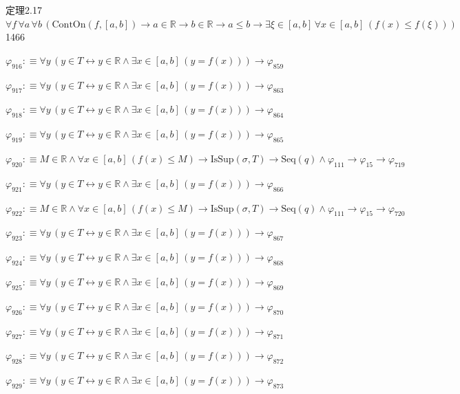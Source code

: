 \begin{fullproof}{定理2.17}{$\forall f\,\forall a\,\forall b\,(\mathrm{ContOn}(f,[a,b]) \to a \in \mathbb{R} \to b \in \mathbb{R} \to a \leq b \to \exists \xi \in [a,b]\,\forall x \in [a,b]\,(f(x) \leq f(\xi)))$}{1466}
\begin{abbrevlist}
\item $\varphi_{916} :\equiv \forall y\,(y \in T \leftrightarrow y \in \mathbb{R} \land \exists x \in [a,b]\,(y = f(x))) \to \varphi_{859}$
\item $\varphi_{917} :\equiv \forall y\,(y \in T \leftrightarrow y \in \mathbb{R} \land \exists x \in [a,b]\,(y = f(x))) \to \varphi_{863}$
\item $\varphi_{918} :\equiv \forall y\,(y \in T \leftrightarrow y \in \mathbb{R} \land \exists x \in [a,b]\,(y = f(x))) \to \varphi_{864}$
\item $\varphi_{919} :\equiv \forall y\,(y \in T \leftrightarrow y \in \mathbb{R} \land \exists x \in [a,b]\,(y = f(x))) \to \varphi_{865}$
\item $\varphi_{920} :\equiv M \in \mathbb{R} \land \forall x \in [a,b]\,(f(x) \leq M) \to \mathrm{IsSup}(\sigma,T) \to \mathrm{Seq}(q) \land \varphi_{111} \to \varphi_{15} \to \varphi_{719}$
\item $\varphi_{921} :\equiv \forall y\,(y \in T \leftrightarrow y \in \mathbb{R} \land \exists x \in [a,b]\,(y = f(x))) \to \varphi_{866}$
\item $\varphi_{922} :\equiv M \in \mathbb{R} \land \forall x \in [a,b]\,(f(x) \leq M) \to \mathrm{IsSup}(\sigma,T) \to \mathrm{Seq}(q) \land \varphi_{111} \to \varphi_{15} \to \varphi_{720}$
\item $\varphi_{923} :\equiv \forall y\,(y \in T \leftrightarrow y \in \mathbb{R} \land \exists x \in [a,b]\,(y = f(x))) \to \varphi_{867}$
\item $\varphi_{924} :\equiv \forall y\,(y \in T \leftrightarrow y \in \mathbb{R} \land \exists x \in [a,b]\,(y = f(x))) \to \varphi_{868}$
\item $\varphi_{925} :\equiv \forall y\,(y \in T \leftrightarrow y \in \mathbb{R} \land \exists x \in [a,b]\,(y = f(x))) \to \varphi_{869}$
\item $\varphi_{926} :\equiv \forall y\,(y \in T \leftrightarrow y \in \mathbb{R} \land \exists x \in [a,b]\,(y = f(x))) \to \varphi_{870}$
\item $\varphi_{927} :\equiv \forall y\,(y \in T \leftrightarrow y \in \mathbb{R} \land \exists x \in [a,b]\,(y = f(x))) \to \varphi_{871}$
\item $\varphi_{928} :\equiv \forall y\,(y \in T \leftrightarrow y \in \mathbb{R} \land \exists x \in [a,b]\,(y = f(x))) \to \varphi_{872}$
\item $\varphi_{929} :\equiv \forall y\,(y \in T \leftrightarrow y \in \mathbb{R} \land \exists x \in [a,b]\,(y = f(x))) \to \varphi_{873}$

\end{abbrevlist}
\end{fullproof}
